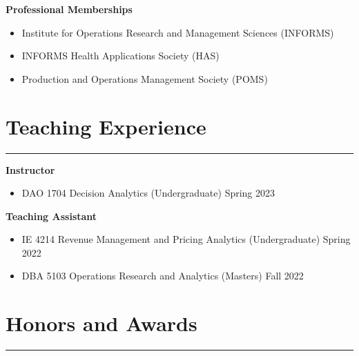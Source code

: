 \documentclass[12pt, a4paper]{article}
\begin{document}
{\raggedright\textbf{Professional Memberships}

\begin{itemize}[leftmargin=26pt, itemsep=2pt, parsep=0pt, topsep=-0.5em]
	\item Institute for Operations Research and Management Sciences (INFORMS)
	\item INFORMS Health Applications Society (HAS)
	\item Production and Operations Management Society (POMS)
\end{itemize}




\section*{Teaching Experience}
\vspace*{0.4em}
\hrule height 0.5pt

\raggedright\textbf{Instructor}
\begin{itemize}[leftmargin=26pt, itemsep=2pt, parsep=0pt, topsep=-0.5em]

	\item DAO 1704 Decision Analytics (Undergraduate) \hfill Spring 2023

\end{itemize}

\raggedright\textbf{Teaching Assistant}
\begin{itemize}[leftmargin=26pt, itemsep=2pt, parsep=0pt, topsep=-0.5em]

	\item IE 4214 Revenue Management and Pricing Analytics (Undergraduate) \hfill Spring 2022

	\item DBA 5103 Operations Research and Analytics (Masters) \hfill Fall 2022

\end{itemize}




\section*{Honors and Awards}
\vspace*{0.4em}
\hrule height 0.5pt
\begin{itemize}[leftmargin=26pt, itemsep=1pt, parsep=0.5pt, topsep=1pt]


\end{itemize}}
\end{document}
